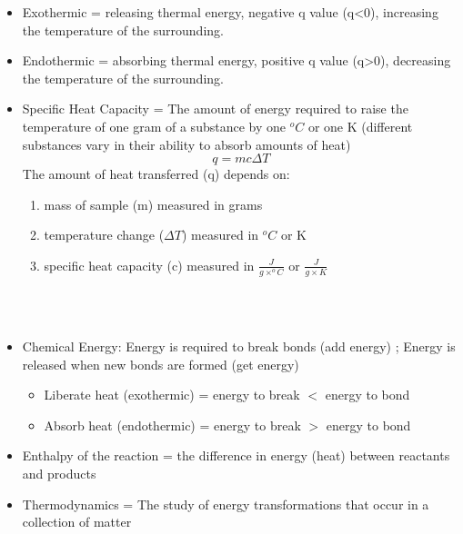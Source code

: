 \documentclass[11pt]{article}
\begin{document}
\begin{itemize}
    \\
    \item Exothermic = releasing thermal energy, negative q value (q<0), increasing the temperature of the surrounding. 
    \item Endothermic = absorbing thermal energy, positive q value (q>0), decreasing the temperature of the surrounding.
    \item Specific Heat Capacity = The amount of energy required to raise the temperature of one gram of a substance by one $^oC$ or one K (different substances vary in their ability to absorb amounts of heat)
    \pagebreak
    \begin{equation}
        q=mc\Delta T
    \end{equation}
    The amount of heat transferred (q) depends on:
    \begin{enumerate}
        \item mass of sample (m) measured in grams
        \item temperature change ($\Delta T$) measured in $^oC$ or K
        \item specific heat capacity (c) measured in $\frac{J}{g\times ^oC}$ or $\frac{J}{g\times K}$
    \end{enumerate}
    \\
    \\
    \item Chemical Energy: Energy is required to break bonds (add energy) ; Energy is released when new bonds are formed (get energy)
        \begin{itemize}
            \item Liberate heat (exothermic) = energy to break $<$ energy to bond
            \item Absorb heat (endothermic) = energy to break $>$ energy to bond
        \end{itemize}
    \item Enthalpy of the reaction = the difference in energy (heat) between reactants and products
    \item Thermodynamics = The study of energy transformations that occur in a collection of matter
\end{itemize}
\end{document}
